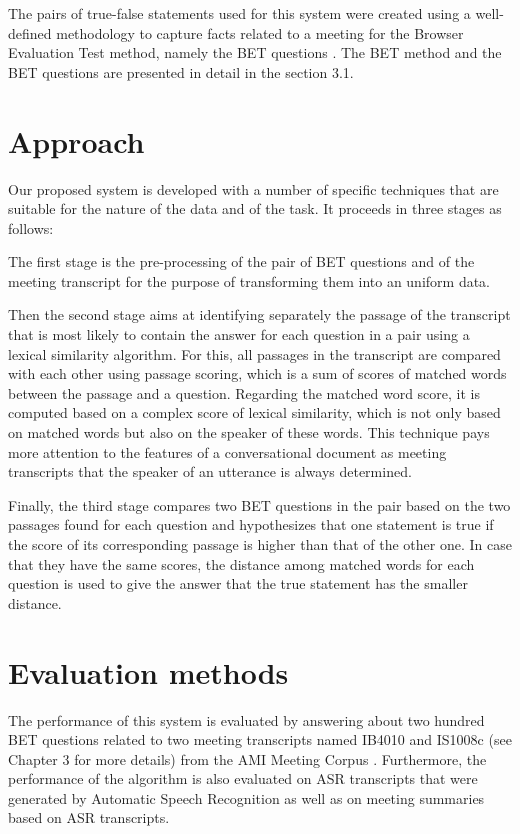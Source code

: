 The pairs of true-false statements used for this system were created using a well-defined methodology to capture facts related to a meeting for the Browser Evaluation Test method, namely the BET questions \cite{BET}. The BET method and the BET questions are presented in detail  in the section 3.1.







\section{Approach}
Our proposed system is developed with a number of specific techniques that are suitable for the nature of the data and of the task. It proceeds in three stages as follows: 

The first stage is the pre-processing of the pair of BET questions and of the meeting transcript for the purpose of transforming them into an uniform data.

Then the second stage aims at identifying separately the passage of the transcript that is most likely to contain the answer for each question in a pair using a lexical similarity algorithm. For this, all passages in the transcript are compared with each other using passage scoring, which is a sum of scores of matched words between the passage and a question. Regarding the matched word score, it is computed based on a complex score of lexical similarity, which is not only based on matched words but also on the speaker of these words. This technique pays more attention to the features of a conversational document as meeting transcripts that the speaker of an utterance is always determined. 
 
Finally, the third stage compares two BET questions in the pair based on the two passages found for each question and hypothesizes that one statement is true if the score of its corresponding passage is higher than that of the other one. In case that they have the same scores, the distance among matched words for each question is used to give the answer that the true statement has the smaller distance. 


\section{Evaluation methods}
The performance of this system is evaluated by answering about two hundred BET questions related to two meeting transcripts named IB4010 and IS1008c (see Chapter 3 for more details) from the AMI Meeting Corpus \cite{AMI_corpus}. Furthermore, the performance of the algorithm is also evaluated on ASR transcripts that were generated by Automatic Speech Recognition \cite{ASR_transcrips} as well as on meeting summaries based on ASR transcripts.
 
